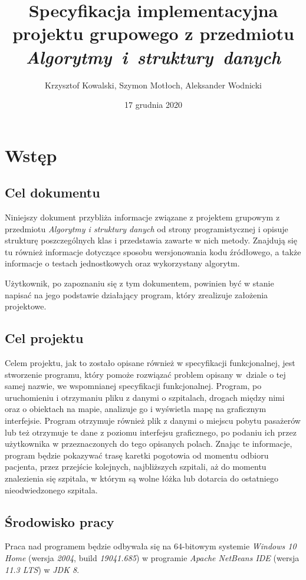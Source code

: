 \documentclass[12pt,a4paper]{article}
\title{Specyfikacja implementacyjna projektu grupowego z przedmiotu \textit{Algorytmy~i~struktury~danych}}
\author{Krzysztof Kowalski, Szymon Motłoch, Aleksander Wodnicki}
\date{17 grudnia 2020}
\begin{document}
\maketitle
\thispagestyle{empty}
\newpage
\pagestyle{fancy}
\fancyhf{}
\tableofcontents
\newpage

\section{Wstęp}
\subsection{Cel dokumentu}
Niniejszy dokument przybliża informacje związane z projektem grupowym z przedmiotu \textit{Algorytmy i struktury danych} od strony programistycznej i opisuje strukturę poszczególnych klas i przedstawia zawarte w nich metody. Znajdują się tu również informacje dotyczące sposobu wersjonowania kodu źródłowego, a także informacje o testach jednostkowych oraz wykorzystany algorytm.

Użytkownik, po zapoznaniu się z tym dokumentem, powinien być w stanie napisać na jego podstawie działający program, który zrealizuje założenia projektowe.

\subsection{Cel projektu}
Celem projektu, jak to zostało opisane również w specyfikacji funkcjonalnej, jest stworzenie programu, który pomoże rozwiązać problem opisany w~dziale o tej samej nazwie, we wspomnianej specyfikacji funkcjonalnej. Program, po uruchomieniu i otrzymaniu pliku z danymi o szpitalach, drogach między nimi oraz o obiektach na mapie, analizuje go i wyświetla mapę na graficznym interfejsie. Program otrzymuje również plik z danymi o miejscu pobytu pasażerów lub też otrzymuje te dane z poziomu interfejsu graficznego, po podaniu ich przez użytkownika w przeznaczonych do tego opisanych polach. Znając te informacje, program będzie pokazywać trasę karetki pogotowia od momentu odbioru pacjenta, przez przejście kolejnych, najbliższych szpitali, aż do momentu znalezienia się szpitala, w którym są wolne łóżka lub dotarcia do ostatniego nieodwiedzonego szpitala. 

\subsection{Środowisko pracy} 
Praca nad programem będzie odbywała się na 64-bitowym systemie \textit{Windows 10 Home} (wersja \textit{2004}, build \textit{19041.685}) w programie \textit{Apache NetBeans IDE} (wersja \textit{11.3 LTS}) w \textit{JDK 8}.
\newpage
\end{document}
